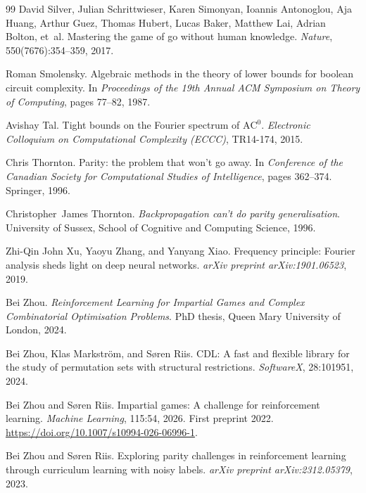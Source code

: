 \documentclass[11pt]{article}
\newcommand{\AC}{\mathrm{AC}}
\theoremstyle{plain}
\theoremstyle{definition}
\theoremstyle{remark}
\numberwithin{equation}{section}
\begin{document}
\begin{thebibliography}{99}
David Silver, Julian Schrittwieser, Karen Simonyan, Ioannis Antonoglou,
Aja Huang, Arthur Guez, Thomas Hubert, Lucas Baker, Matthew Lai,
Adrian Bolton, et~al.
\newblock Mastering the game of go without human knowledge.
\newblock \emph{Nature}, 550(7676):354--359, 2017.

Roman Smolensky.
\newblock Algebraic methods in the theory of lower bounds for boolean circuit complexity.
\newblock In \emph{Proceedings of the 19th Annual ACM Symposium on Theory of Computing}, pages 77--82, 1987.

Avishay Tal.
\newblock Tight bounds on the Fourier spectrum of $\AC^0$.
\newblock \emph{Electronic Colloquium on Computational Complexity (ECCC)}, TR14-174, 2015.

Chris Thornton.
\newblock Parity: the problem that won't go away.
\newblock In \emph{Conference of the Canadian Society for Computational Studies of Intelligence}, pages 362--374. Springer, 1996.

Christopher~James Thornton.
\newblock \emph{Backpropagation can't do parity generalisation}.
\newblock University of Sussex, School of Cognitive and Computing Science, 1996.

Zhi-Qin John Xu, Yaoyu Zhang, and Yanyang Xiao.
\newblock Frequency principle: Fourier analysis sheds light on deep neural networks.
\newblock \emph{arXiv preprint arXiv:1901.06523}, 2019.

Bei Zhou.
\newblock \emph{Reinforcement Learning for Impartial Games and Complex Combinatorial Optimisation Problems}.
\newblock PhD thesis, Queen Mary University of London, 2024.

Bei Zhou, Klas Markstr{\"o}m, and S{\o}ren Riis.
\newblock CDL: A fast and flexible library for the study of permutation sets with structural restrictions.
\newblock \emph{SoftwareX}, 28:101951, 2024.

Bei Zhou and S{\o}ren Riis.
\newblock Impartial games: A challenge for reinforcement learning.
\newblock \emph{Machine Learning}, 115:54, 2026. First preprint 2022.
\newblock \url{https://doi.org/10.1007/s10994-026-06996-1}.

Bei Zhou and S{\o}ren Riis.
\newblock Exploring parity challenges in reinforcement learning through curriculum learning with noisy labels.
\newblock \emph{arXiv preprint arXiv:2312.05379}, 2023.

\end{thebibliography}
\end{document}
